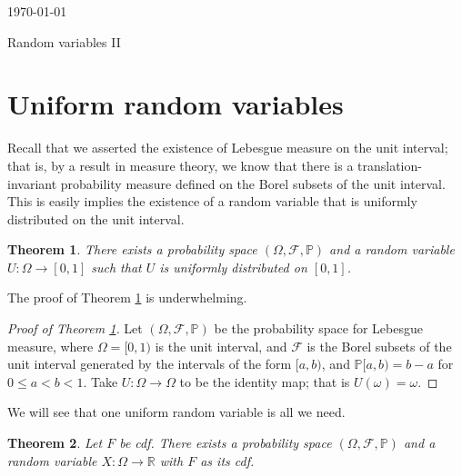 \documentclass[12pt, reqno]{amsart}
\newtheorem{theorem}{Theorem}
\renewcommand{\P}{{\mathbb P}}  %
\newcommand{\R}{{\mathbb R}}
\newcommand{\F}{{\mathcal F}}     %
\begin{document}
\today
\begin{title}
{Random variables II}
\end{title}
\maketitle{}

\begin{abstract}
We will discuss the existence of random variables and independent sequences of random variables. 
\end{abstract}


\section{Uniform random variables}

Recall that we asserted the existence of Lebesgue measure on the unit interval; that is, by a result in measure theory, we know that there is a translation-invariant probability measure defined on the Borel subsets of the unit interval.   This is easily implies the existence of a random variable that is uniformly distributed on the unit interval.

 \begin{theorem} 
 \label{exU}
   There exists a probability space $(\Omega, \F, \P)$ and a random variable $U: \Omega \to [0,1]$ such that $U$ is uniformly distributed on $[0,1]$.
 
    \end{theorem}   
The proof of Theorem \ref{exU} is underwhelming.

\begin{proof}[Proof of Theorem \ref{exU}]
Let $(\Omega, \F, \P)$ be the probability space for Lebesgue measure, where $\Omega = [0,1)$ is the unit interval, and $\F$ is the Borel subsets of the unit interval generated by the intervals of the form $[a,b)$, and $\P[a, b) = b-a$ for $ 0 \leq a < b <1$.    Take $U: \Omega \to \Omega$ to be the identity map; that is $U(\omega) = \omega$.  
\end{proof}


We will see that one uniform random variable is all we need.


\begin{theorem}
\label{everything}
  Let $F$ be cdf.  There exists a probability space $(\Omega, \F, \P)$ and a random variable $X: \Omega \to \R$ with $F$ as its cdf.

\end{theorem}
\end{document}
